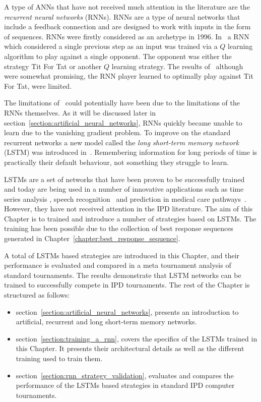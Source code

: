 A type of ANNs that have not received much attention in the literature are the
\textit{recurrent neural networks} (RNNs). RNNs are a type of neural networks
that include a feedback connection and are designed to work with inputs in
the form of sequences. RNNs were firstly considered as an archetype in 1996.
In~\cite{Sandholm1996} a RNN which considered a single previous step
as an input was trained via a \(Q\) learning algorithm to play against a single
opponent. The opponent was either the strategy Tit For Tat or another \(Q\)
learning strategy. The results of~\cite{Sandholm1996} although were somewhat
promising, the RNN player learned to optimally play against Tit For Tat,
were limited.

The limitations of~\cite{Sandholm1996} could potentially have been due to the
limitations of the RNNs themselves. As it will be discussed later in
section~\ref{section:artificial_neural_networks}, RNNs
quickly became unable to learn due to the vanishing gradient problem.
To improve on the standard recurrent networks a new model called the
\textit{long short-term memory network} (LSTM) was introduced in~\cite{Hochreiter1997}.
Remembering information for long periods of time is practically
their default behaviour, not something they struggle to learn.

LSTMs are a set of networks that have been proven to be successfully trained and
today are being used in a number of innovative applications such as time series
analysis \cite{Malhotra2015}, speech recognition~\cite{Sak2014} and prediction
in medical care pathways~\cite{Wang2018_lstm}. However, they have not received
attention in the IPD literature. The aim of this Chapter is to trained and
introduce a number of strategies based on LSTMs. The training has been possible
due to the collection of best response sequences generated in
Chapter~\ref{chapter:best_response_sequence}.

A total of \lstmstrategies LSTMs based strategies are introduced in this
Chapter, and their performance is evaluated and compared in a meta tournament
analysis of \metatournamentslstm standard tournaments. The results demonstrate
that LSTM networks can be trained to successfully compete in IPD tournaments.
The rest of the Chapter is structured as follows:

\begin{itemize}
    \item section~\ref{section:artificial_neural_networks}, presents an
    introduction to artificial, recurrent and long short-term memory networks.
    \item section~\ref{section:training_a_rnn}, covers the specifics of the LSTMs
    trained in this Chapter. It presents their architectural details as well
    as the different training used to train them.
    \item section~\ref{section:rnn_strategy_validation}, evaluates and compares
    the performance of the \lstmstrategies LSTMs based strategies in
    \metatournamentslstm standard IPD computer tournaments.
\end{itemize}

